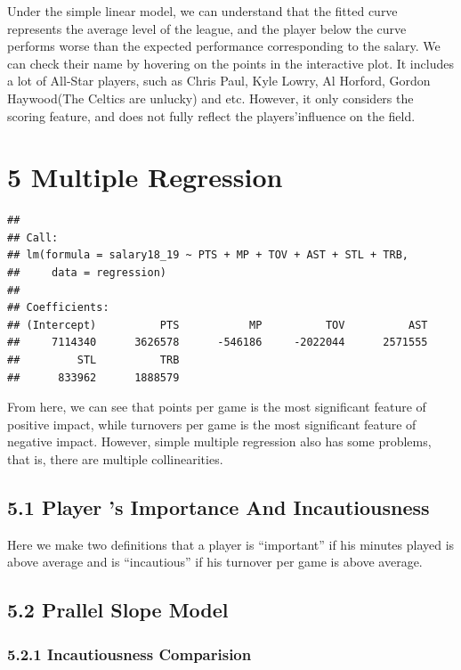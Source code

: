 \documentclass[]{article}
\begin{document}
Under the simple linear model, we can understand that the fitted curve
represents the average level of the league, and the player below the
curve performs worse than the expected performance corresponding to the
salary. We can check their name by hovering on the points in the
interactive plot. It includes a lot of All-Star players, such as Chris
Paul, Kyle Lowry, Al Horford, Gordon Haywood(The Celtics are unlucky)
and etc. However, it only considers the scoring feature, and does not
fully reflect the players'influence on the field.

\section{5 Multiple Regression}\label{multiple-regression}

\begin{verbatim}
## 
## Call:
## lm(formula = salary18_19 ~ PTS + MP + TOV + AST + STL + TRB, 
##     data = regression)
## 
## Coefficients:
## (Intercept)          PTS           MP          TOV          AST  
##     7114340      3626578      -546186     -2022044      2571555  
##         STL          TRB  
##      833962      1888579
\end{verbatim}

From here, we can see that points per game is the most significant
feature of positive impact, while turnovers per game is the most
significant feature of negative impact. However, simple multiple
regression also has some problems, that is, there are multiple
collinearities.

\subsection{5.1 Player 's Importance And
Incautiousness}\label{player-s-importance-and-incautiousness}

Here we make two definitions that a player is ``important'' if his
minutes played is above average and is ``incautious'' if his turnover
per game is above average.

\subsection{5.2 Prallel Slope Model}\label{prallel-slope-model}

\subsubsection{5.2.1 Incautiousness
Comparision}\label{incautiousness-comparision}
\end{document}
